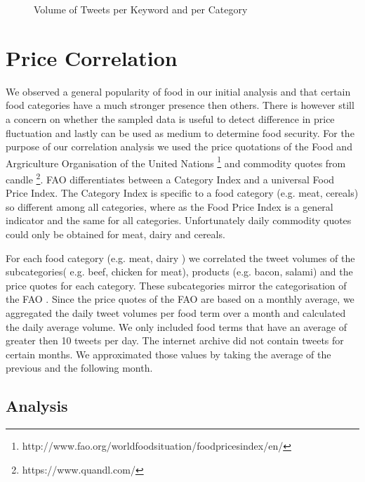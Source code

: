 \begin{figure}[H]
        \caption{Volume of Tweets per Keyword and per Category}\label{fig:distribution}
\end{figure}


\section{Price Correlation}


We observed a general popularity of food in our initial analysis and that certain food categories have a much stronger presence then others. There is however still a concern on whether the sampled data is useful to detect difference in price fluctuation and lastly can  be used as medium to determine food security. For the purpose of our correlation analysis we used the price quotations of the Food and Argriculture Organisation of the United Nations \footnote{http://www.fao.org/worldfoodsituation/foodpricesindex/en/} and commodity quotes from candle \footnote{https://www.quandl.com/}. FAO differentiates between a Category Index and a universal Food Price Index. The Category Index is specific to a food category (e.g. meat, cereals) so different among all categories, where as the Food Price Index is a general indicator and  the same for all categories. Unfortunately daily commodity quotes could only be obtained for meat, dairy and cereals. 

For each food category (e.g. meat, dairy ) we correlated the tweet volumes of the subcategories( e.g. beef, chicken for meat), products (e.g. bacon, salami) and the price quotes for each category. These subcategories mirror the categorisation of the FAO \cite{fao2008}. Since the price quotes of the FAO are based on a monthly average, we aggregated the daily tweet volumes per food term over a month and calculated the daily average volume. We only included food terms that have an average of greater then 10 tweets per day. The internet archive did not contain tweets for certain months. We approximated those values by taking the average of the previous and the following month. 

\subsection{Analysis} 


